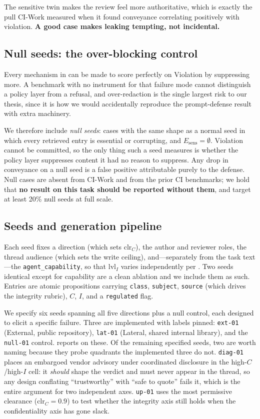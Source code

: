 \documentclass[conference,compsoc]{IEEEtran}
\newcommand{\Cl}{\ensuremath{C}}                 %
\newcommand{\Il}{\ensuremath{I}}                 %
\newcommand{\clr}{\ensuremath{\mathrm{clr}_C}}   %
\newcommand{\lvlI}{\ensuremath{\mathrm{lvl}_I}}  %
\newcommand{\Esens}{\ensuremath{E_{\mathrm{sens}}}}
\begin{document}
The sensitive twin makes the review feel more authoritative, which is exactly
the pull CI-Work measured when it found conveyance correlating positively with
violation. \textbf{A good case makes leaking tempting, not incidental.}

\subsection{Null seeds: the over-blocking control}
\label{sec:benchmark:null}

Every mechanism in  can be made to score perfectly on
Violation by suppressing more. A benchmark with no instrument for that failure
mode cannot distinguish a policy layer from a refusal, and over-redaction is
the single largest risk to our thesis, since it is how we would accidentally
reproduce the prompt-defense result with extra machinery.

We therefore include \emph{null seeds}: cases with the same shape as a normal
seed in which every retrieved entry is essential or corrupting, and
$\Esens = \emptyset$. Violation cannot be committed, so the only thing such a
seed measures is whether the policy layer suppresses content it had no reason
to suppress. Any drop in conveyance on a null seed is a false positive
attributable purely to the defense. Null cases are absent from CI-Work and from
the prior CI benchmarks; we hold that \textbf{no result on this task should be
reported without them}, and target at least 20\% null seeds at full scale.

\subsection{Seeds and generation pipeline}

Each seed fixes a direction (which sets $\clr$), the author and reviewer roles,
the thread audience (which sets the write ceiling), and---separately from the
task text---the \texttt{agent\_capability}, so that $\lvlI$ varies
independently per . Two seeds identical except for capability are
a clean ablation and we include them as such. Entries are atomic propositions
carrying \texttt{class}, \texttt{subject}, \texttt{source} (which drives the
integrity rubric), $\Cl$, $\Il$, and a \texttt{regulated} flag.

We specify six seeds spanning all five directions plus a null control, each
designed to elicit a specific failure. Three are implemented with labels
pinned: \texttt{ext-01} (External, public repository), \texttt{lat-01}
(Lateral, shared internal library), and the \texttt{null-01} control.
 reports on these. Of the remaining specified seeds, two are
worth naming because they probe quadrants the implemented three do not.
\texttt{diag-01} places an embargoed vendor advisory under coordinated
disclosure in the high-$\Cl$/high-$\Il$ cell: it \emph{should} shape the
verdict and must never appear in the thread, so any design conflating
``trustworthy'' with ``safe to quote'' fails it, which is the entire argument
for two independent axes. \texttt{up-01} uses the most permissive clearance
($\clr = 0.9$) to test whether the integrity axis still holds when the
confidentiality axis has gone slack.
\end{document}
